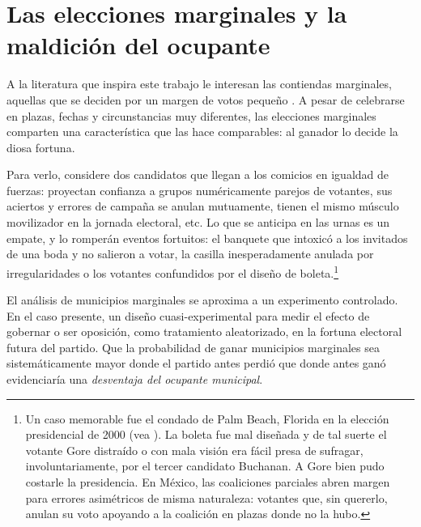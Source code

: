 \documentclass[letter,12pt]{article}
\begin{document}
\section{Las elecciones marginales y la maldición del ocupante}

A la literatura que inspira este trabajo le interesan las contiendas marginales, aquellas que se deciden por un margen de votos pequeño \citep{mayhew1974vanishingMg,cox.1999}. A pesar de celebrarse en plazas, fechas y circunstancias muy diferentes, las elecciones marginales comparten una característica que las hace comparables: al ganador lo decide la diosa fortuna.

Para verlo, considere dos candidatos que llegan a los comicios en igualdad de fuerzas: proyectan confianza a grupos numéricamente parejos de votantes, sus aciertos y errores de campaña se anulan mutuamente, tienen el mismo músculo movilizador en la jornada electoral, etc. Lo que se anticipa en las urnas es un empate, y lo romperán eventos fortuitos: el banquete que intoxicó a los invitados de una boda y no salieron a votar, la casilla inesperadamente anulada por irregularidades o los votantes confundidos por el diseño de boleta.\footnote{Un caso memorable fue el condado de Palm Beach, Florida en la elección presidencial de 2000 (vea \citet{nyt-cohn-palmbeach.2024}). La boleta fue mal diseñada y de tal suerte el votante Gore distraído o con mala visión era fácil presa de sufragar, involuntariamente, por el tercer candidato Buchanan. A Gore bien pudo costarle la presidencia. En México, las coaliciones parciales abren margen para errores asimétricos de misma naturaleza: votantes que, sin quererlo, anulan su voto apoyando a la coalición en plazas donde no la hubo.}

El análisis de municipios marginales se aproxima a un experimento controlado. En el caso presente, un diseño cuasi-experimental para medir el efecto de gobernar o ser oposición, como tratamiento aleatorizado, en la fortuna electoral futura del partido. Que la probabilidad de ganar municipios marginales sea sistemáticamente mayor donde el partido antes perdió que donde antes ganó evidenciaría una \emph{desventaja del ocupante municipal}.
\end{document}
